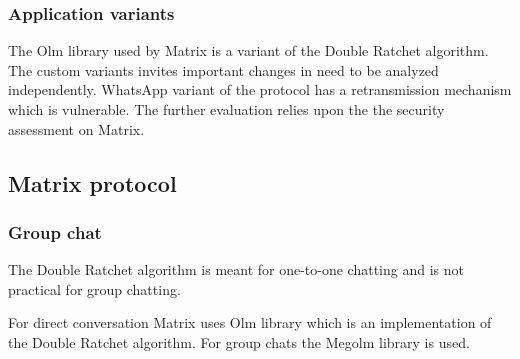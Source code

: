  




\subsubsection{Application variants}

The Olm library used by Matrix is a variant of the Double Ratchet algorithm. The custom variants invites important changes in need to be analyzed independently. WhatsApp variant of the protocol has a retransmission mechanism which is vulnerable. 
The further evaluation relies upon the the security assessment on Matrix. 

\subsection{Matrix protocol}




\subsubsection{Group chat}
The Double Ratchet algorithm is meant for one-to-one chatting and is not practical for group chatting. %

For direct conversation Matrix uses Olm library which is an implementation of the Double Ratchet algorithm. For group chats the Megolm library is used. 

